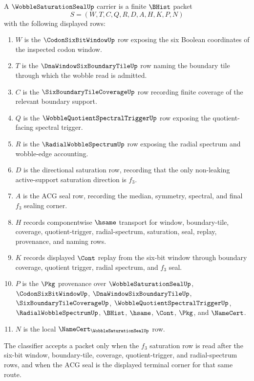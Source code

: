 \begin{definition}
\label{def:wobble-saturation-seal-carrier}
A $\WobbleSaturationSealUp$ carrier is a finite $\BHist$ packet
$$
S=(W,T,C,Q,R,D,A,H,K,P,N)
$$
with the following displayed rows:
\begin{enumerate}
\item $W$ is the $\CodonSixBitWindowUp$ row exposing the six Boolean coordinates of the inspected codon window.
\item $T$ is the $\DnaWindowSixBoundaryTileUp$ row naming the boundary tile through which the wobble read is admitted.
\item $C$ is the $\SixBoundaryTileCoverageUp$ row recording finite coverage of the relevant boundary support.
\item $Q$ is the $\WobbleQuotientSpectralTriggerUp$ row exposing the quotient-facing spectral trigger.
\item $R$ is the $\RadialWobbleSpectrumUp$ row exposing the radial spectrum and wobble-edge accounting.
\item $D$ is the directional saturation row, recording that the only non-leaking active-support saturation direction is $f_{3}$.
\item $A$ is the $\mathrm{ACG}$ seal row, recording the median, symmetry, spectral, and final $f_{3}$ sealing corner.
\item $H$ records componentwise $\hsame$ transport for window, boundary-tile, coverage, quotient-trigger, radial-spectrum, saturation, seal, replay, provenance, and naming rows.
\item $K$ records displayed $\Cont$ replay from the six-bit window through boundary coverage, quotient trigger, radial spectrum, and $f_{3}$ seal.
\item $P$ is the $\Pkg$ provenance over $\WobbleSaturationSealUp$, $\CodonSixBitWindowUp$, $\DnaWindowSixBoundaryTileUp$, $\SixBoundaryTileCoverageUp$, $\WobbleQuotientSpectralTriggerUp$, $\RadialWobbleSpectrumUp$, $\BHist$, $\hsame$, $\Cont$, $\Pkg$, and $\NameCert$.
\item $N$ is the local $\NameCert_{\WobbleSaturationSealUp}$ row.
\end{enumerate}
The classifier accepts a packet only when the $f_{3}$ saturation row is read after the six-bit window, boundary-tile, coverage, quotient-trigger, and radial-spectrum rows, and when the $\mathrm{ACG}$ seal is the displayed terminal corner for that same route.
\end{definition}

